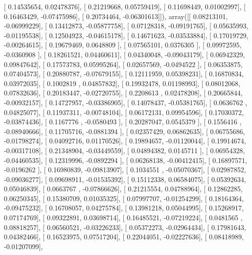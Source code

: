 \documentclass{article}
\begin{document}
       [ 0.14535654,  0.02478376],
       [ 0.21219668,  0.05759419],
       [ 0.11698449,  0.01002997],
       [ 0.16463429, -0.07475986],
       [ 0.20734464, -0.06301613]]), array([[ 0.08213101, -0.06999229],
       [ 0.13412873, -0.05877758],
       [ 0.07128318, -0.09191765],
       [ 0.05635993, -0.01195538],
       [ 0.12504923, -0.04615178],
       [ 0.14671623, -0.03533884],
       [ 0.17019729, -0.00264615],
       [ 0.19679469,  0.0648809 ],
       [ 0.07565101,  0.0376305 ],
       [ 0.09972595, -0.0360908 ],
       [ 0.18261521,  0.04460611],
       [ 0.04340048, -0.09043179],
       [ 0.06942329,  0.09847642],
       [ 0.17573783,  0.05995264],
       [ 0.02657569, -0.0494522 ],
       [ 0.06353875,  0.07404573],
       [ 0.20880787, -0.07679155],
       [ 0.12111959,  0.05398231],
       [ 0.16870834,  0.03972035],
       [ 0.1002819 ,  0.04857832],
       [ 0.19932478,  0.01198993],
       [ 0.08012068,  0.07832636],
       [ 0.20183447, -0.02720755],
       [ 0.2208613 ,  0.02478208],
       [ 0.20665844, -0.00932157],
       [ 0.14727957, -0.03386905],
       [ 0.14078437, -0.05381765],
       [ 0.0636762 ,  0.04825077],
       [ 0.11937311, -0.00748104],
       [ 0.06172131,  0.09954596],
       [ 0.17030372, -0.03874436],
       [ 0.1167776 , -0.0580493 ],
       [ 0.20287047,  0.0545379 ],
       [ 0.1556416 , -0.08940666],
       [ 0.11705716, -0.0881394 ],
       [ 0.02357429,  0.06862635],
       [ 0.06755686, -0.01798274],
       [ 0.04092716,  0.01170526],
       [ 0.19894657, -0.01120044],
       [ 0.19914674, -0.00317108],
       [ 0.21348904, -0.03449559],
       [ 0.04894382,  0.0145711 ],
       [ 0.06954328, -0.04460535],
       [ 0.12319996, -0.0892294 ],
       [ 0.06268138, -0.00412415],
       [ 0.16897571, -0.0196262 ],
       [ 0.16980839, -0.09813907],
       [ 0.1034551 , -0.05070367],
       [ 0.02987852, -0.09036277],
       [ 0.09698911, -0.01535392],
       [ 0.15112338,  0.06584075],
       [ 0.05392634,  0.05046839],
       [ 0.0663767 , -0.07866626],
       [ 0.21215554,  0.04788964],
       [ 0.12862285,  0.06250345],
       [ 0.15380709,  0.01035325],
       [ 0.07997707, -0.01254299],
       [ 0.18164364, -0.09475232],
       [ 0.16708057,  0.04275784],
       [ 0.13981218,  0.05044995],
       [ 0.15268917,  0.07174769],
       [ 0.09322891,  0.03698714],
       [ 0.16485521, -0.07219224],
       [ 0.0481565 ,  0.08818257],
       [ 0.06560521, -0.03226233],
       [ 0.05372273, -0.02964434],
       [ 0.17981643,  0.04382466],
       [ 0.16523975,  0.07517204],
       [ 0.22044051, -0.02227636],
       [ 0.08418989, -0.01207099],
\end{document}
